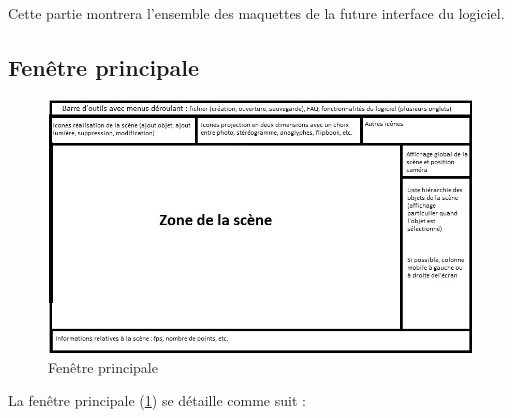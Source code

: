 Cette partie montrera l’ensemble des maquettes de la future interface du logiciel.

\subsection{Fenêtre principale}

\begin{figure}[H]
  \centering
  \includegraphics[scale=0.6]{fenetreprincipale}
  \caption{Fenêtre principale}
  \label{fig:fenppale}
\end{figure}

La fenêtre principale (\ref{fig:fenppale}) se détaille comme suit :

